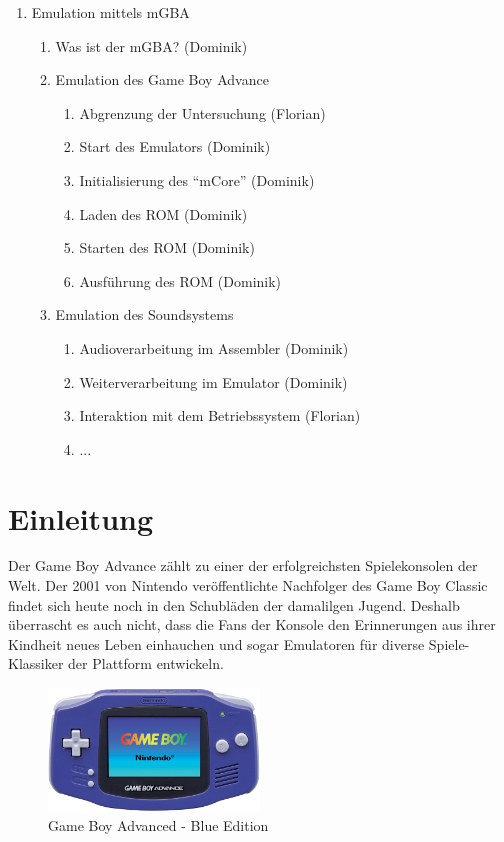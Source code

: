 \documentclass[11pt,a4paper]{scrartcl}
\begin{document}
\begin{enumerate}
    \item Emulation mittels mGBA
    \begin{enumerate}
        \item Was ist der mGBA? (Dominik)
        \item Emulation des Game Boy Advance
        \begin{enumerate}
            \item Abgrenzung der Untersuchung (Florian)
            \item Start des Emulators (Dominik)
            \item Initialisierung des \enquote{mCore} (Dominik)
            \item Laden des ROM (Dominik)
            \item Starten des ROM (Dominik)
            \item Ausf\"uhrung des ROM (Dominik)
        \end{enumerate}
        
        \item Emulation des Soundsystems
        \begin{enumerate}
            \item Audioverarbeitung im Assembler (Dominik)
            \item Weiterverarbeitung im Emulator (Dominik)
            \item Interaktion mit dem Betriebssystem (Florian)
            \item ...
        \end{enumerate}
    \end{enumerate}
\end{enumerate}


\newpage


\section{Einleitung}

Der Game Boy Advance z\"ahlt zu einer der erfolgreichsten Spielekonsolen der Welt. Der 2001 von Nintendo\cite{NintendoGeschichte} ver\"offentlichte Nachfolger des Game Boy Classic findet sich heute noch in den Schubl\"aden der damalilgen Jugend. Deshalb \"uberrascht es auch nicht, dass die Fans der Konsole den Erinnerungen aus ihrer Kindheit neues Leben einhauchen und sogar Emulatoren f\"ur diverse Spiele-Klassiker der Plattform entwickeln.

\begin{figure}[h]
    \centering
    \includegraphics[width=0.5\textwidth]{GameBoyAdvance}
    \caption{Game Boy Advanced - Blue Edition}
    \label{fig:gba}
\end{figure}
\end{document}
